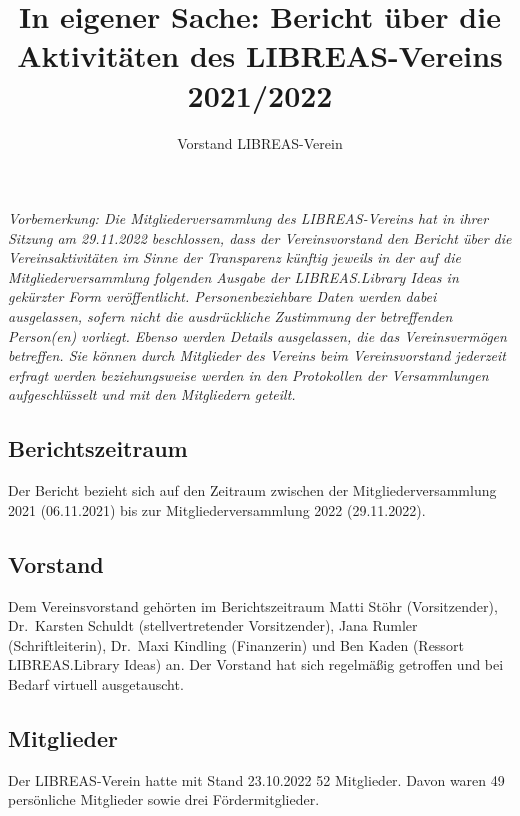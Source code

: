 \documentclass[a4paper,
fontsize=11pt,
oneside,
numbers=noperiodatend,
parskip=half-,
bibliography=totoc,
final
]{scrartcl}
\title{\LARGE{In eigener Sache: Bericht über die Aktivitäten des LIBREAS-Vereins 2021/2022}}%
\author{Vorstand LIBREAS-Verein} %
\date{}
\begin{document}
\maketitle
\thispagestyle{fancyplain} 


\emph{Vorbemerkung: Die Mitgliederversammlung des LIBREAS-Vereins hat in
ihrer Sitzung am 29.11.2022 beschlossen, dass der Vereinsvorstand den
Bericht über die Vereinsaktivitäten im Sinne der Transparenz künftig
jeweils in der auf die Mitgliederversammlung folgenden Ausgabe der
LIBREAS.Library Ideas in gekürzter Form veröffentlicht.
Personenbeziehbare Daten werden dabei ausgelassen, sofern nicht die
ausdrückliche Zustimmung der betreffenden Person(en) vorliegt. Ebenso
werden Details ausgelassen, die das Vereinsvermögen betreffen. Sie
können durch Mitglieder des Vereins beim Vereinsvorstand jederzeit
erfragt werden beziehungsweise werden in den Protokollen der
Versammlungen aufgeschlüsselt und mit den Mitgliedern geteilt.}

\hypertarget{berichtszeitraum}{%
\subsection{Berichtszeitraum}\label{berichtszeitraum}}

Der Bericht bezieht sich auf den Zeitraum zwischen der
Mitgliederversammlung 2021 (06.11.2021) bis zur Mitgliederversammlung
2022 (29.11.2022).

\hypertarget{vorstand}{%
\subsection{Vorstand}\label{vorstand}}

Dem Vereinsvorstand gehörten im Berichtszeitraum Matti Stöhr
(Vorsitzender), Dr.~Karsten Schuldt (stellvertretender Vorsitzender),
Jana Rumler (Schriftleiterin), Dr.~Maxi Kindling (Finanzerin) und Ben
Kaden (Ressort LIBREAS.Library Ideas) an. Der Vorstand hat sich
regelmäßig getroffen und bei Bedarf virtuell ausgetauscht.

\hypertarget{mitglieder}{%
\subsection{Mitglieder}\label{mitglieder}}

Der LIBREAS-Verein hatte mit Stand 23.10.2022 52 Mitglieder. Davon waren
49 persönliche Mitglieder sowie drei Fördermitglieder.
\end{document}

